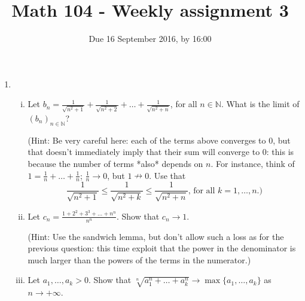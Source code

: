 \documentclass[11pt]{amsart}
\newcommand\N{{\mathbb N}}
\theoremstyle{plain}
\theoremstyle{definition}
\numberwithin{equation}{section}
\begin{document}
\title{Math 104 - Weekly assignment 3}
\author{Due 16 September 2016, by 16:00}
\maketitle

\begin{enumerate}

\item
\begin{enumerate}[(i)]
\item Let $b_n=\frac{1}{\sqrt{n^2+1}}+\frac{1}{\sqrt{n^2+2}}+\ldots +\frac{1}{\sqrt{n^2+n}}$, for all $n\in\N$. What is the limit of $(b_n)_{n\in\N}$?

(Hint: Be very careful here: each of the terms above converges to 0, but that doesn't immediately imply that their sum will converge to 0: this is because the number of terms *also* depends on $n$. For instance, think of $1=\frac{1}{n}+\ldots +\frac{1}{n}$; $\frac{1}{n}\rightarrow 0$, but $1\nrightarrow 0$. Use that
$$\frac{1}{\sqrt{n^2+1}}\leq \frac{1}{\sqrt{n^2+k}}\leq \frac{1}{\sqrt{n^2+n}}\text{, for all }k=1,\ldots,n.)
$$
\vspace{0.1in}
\item Let $c_n=\frac{1+2^2+3^3+\ldots+n^n}{n^n}$. Show that $c_n\rightarrow 1$.

(Hint: Use the sandwich lemma, but don't allow such a loss as for the previous question: this time exploit that the power in the denominator is much larger than the powers of the terms in the numerator.)
\vspace{0.1in}
\item Let $a_1,\ldots,a_k>0$. Show that $\sqrt[n]{a_1^n+\ldots + a_k^n}\rightarrow \max\{a_1,\ldots,a_k\}$ as $n\rightarrow +\infty$.
\end{enumerate}
\vspace{0.4in}


\end{enumerate}
\end{document}
